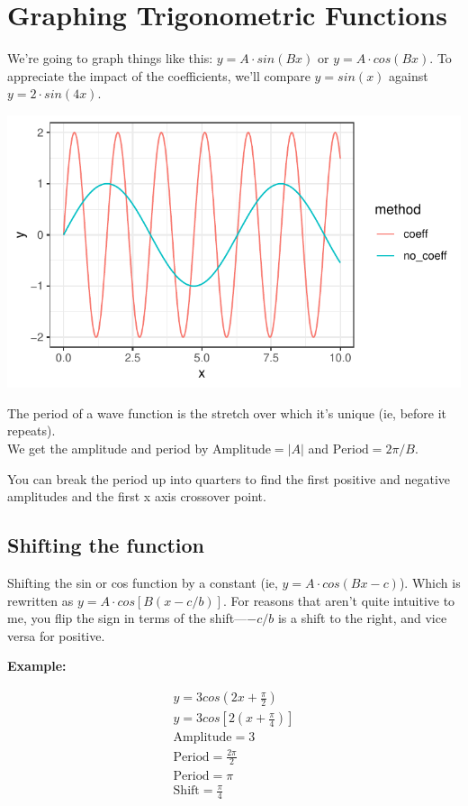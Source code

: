 \documentclass{article}
\begin{document}
\section{Graphing Trigonometric Functions}

We're going to graph things like this: $y = A \cdot sin(Bx)$ or $y = A \cdot cos(Bx)$. To
appreciate the impact of the coefficients, we'll compare $y = sin(x)$ against $y = 2 \cdot
sin(4x)$.

\includegraphics{fig1.pdf}

The period of a wave function is the stretch over which it's unique (ie, before it
repeats). \\

We get the amplitude and period by $\text{Amplitude} = \lvert A \rvert$ and $\text{Period}
= 2 \pi / B$.

You can break the period up into quarters to find the first positive and negative
amplitudes and the first x axis crossover point.

\subsection{Shifting the function}

Shifting the sin or cos function by a constant (ie, $y = A \cdot cos(Bx - c)$). Which is
rewritten as $y = A \cdot cos[B(x - c/b)]$. For reasons that aren't quite intuitive to me,
you flip the sign in terms of the shift---$-c/b$ is a shift to the right, and vice versa
for positive.

\textbf{Example:}

\begin{align*}
y = 3cos(2x + \frac{\pi}{2})\\
y = 3cos[2(x + \frac{\pi}{4})]\\
\text{Amplitude} = 3\\
\text{Period} = \frac{2\pi}{2}\\
\text{Period} = \pi\\
\text{Shift} = \frac{\pi}{4}
\end{align*}
\end{document}
